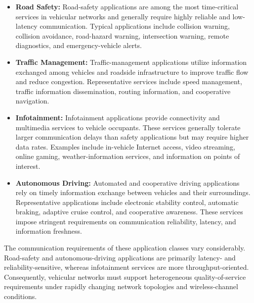 \begin{itemize}

    \item \textbf{Road Safety:}
    Road-safety applications are among the most time-critical services in
    vehicular networks and generally require highly reliable and low-latency
    communication. Typical applications include collision warning, collision
    avoidance, road-hazard warning, intersection warning, remote diagnostics,
    and emergency-vehicle alerts.

    \item \textbf{Traffic Management:}
    Traffic-management applications utilize information exchanged among
    vehicles and roadside infrastructure to improve traffic flow and reduce
    congestion. Representative services include speed management, traffic
    information dissemination, routing information, and cooperative
    navigation.

    \item \textbf{Infotainment:}
    Infotainment applications provide connectivity and multimedia services to
    vehicle occupants. These services generally tolerate larger communication
    delays than safety applications but may require higher data rates.
    Examples include in-vehicle Internet access, video streaming, online
    gaming, weather-information services, and information on points of
    interest.

    \item \textbf{Autonomous Driving:}
    Automated and cooperative driving applications rely on timely information
    exchange between vehicles and their surroundings. Representative
    applications include electronic stability control, automatic braking,
    adaptive cruise control, and cooperative awareness. These services impose
    stringent requirements on communication reliability, latency, and
    information freshness.

\end{itemize}

The communication requirements of these application classes vary
considerably. Road-safety and autonomous-driving applications are primarily
latency- and reliability-sensitive, whereas infotainment services are more
throughput-oriented. Consequently, vehicular networks must support
heterogeneous quality-of-service requirements under rapidly changing network
topologies and wireless-channel conditions.

